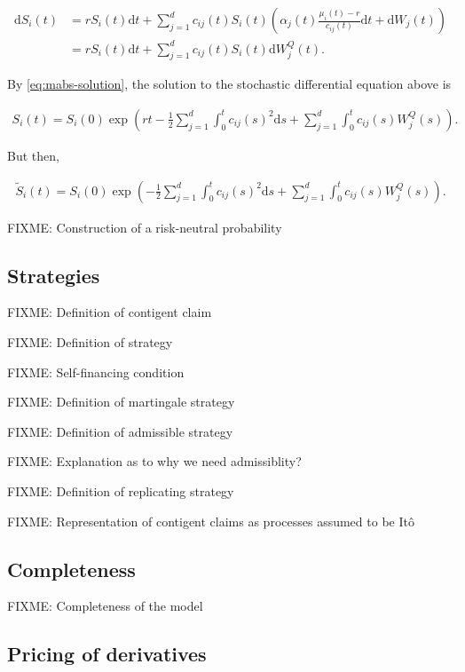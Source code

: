 \documentclass[a4paper]{article}
\begin{document}
\begin{align*}
  \mathrm{d}S_i(t)
  &= r S_i(t) \mathrm{d}t + \sum_{j=1}^{d} c_{ij}(t) S_i(t) \left(\alpha_j(t) \frac{\mu_i(t) - r}{c_{ij}(t)} \mathrm{d}t + \mathrm{d}W_j(t)\right)\\
  &= r S_i(t) \mathrm{d}t + \sum_{j=1}^{d} c_{ij}(t) S_i(t) \mathrm{d}W^Q_j(t).
\end{align*}

By \eqref{eq:mabs-solution}, the solution to the stochastic differential equation above is

\begin{align*}
  S_i(t)
  = S_i(0) \exp \left( r t - \frac{1}{2} \sum_{j=1}^{d} \int_0^t c_{ij}(s)^2 \mathrm{d}s + \sum_{j=1}^{d} \int_0^t c_{ij}(s) W^Q_j(s) \right).
\end{align*}

But then,

\begin{align*}
  \tilde{S}_i(t)
  = S_i(0) \exp \left( - \frac{1}{2} \sum_{j=1}^{d} \int_0^t c_{ij}(s)^2 \mathrm{d}s + \sum_{j=1}^{d} \int_0^t c_{ij}(s) W^Q_j(s) \right).
\end{align*}

FIXME: Construction of a risk-neutral probability

\subsection{Strategies}

FIXME: Definition of contigent claim

FIXME: Definition of strategy

FIXME: Self-financing condition

FIXME: Definition of martingale strategy

FIXME: Definition of admissible strategy

FIXME: Explanation as to why we need admissiblity?

FIXME: Definition of replicating strategy

FIXME: Representation of contigent claims as processes assumed to be It\^o

\subsection{Completeness}

FIXME: Completeness of the model

\subsection{Pricing of derivatives}
\end{document}
